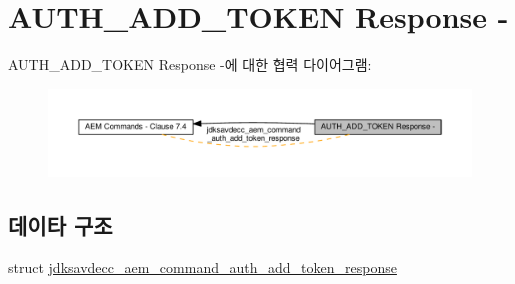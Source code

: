 \hypertarget{group__command__auth__add__token__response}{}\section{A\+U\+T\+H\+\_\+\+A\+D\+D\+\_\+\+T\+O\+K\+EN Response -\/}
\label{group__command__auth__add__token__response}
A\+U\+T\+H\+\_\+\+A\+D\+D\+\_\+\+T\+O\+K\+EN Response -\/에 대한 협력 다이어그램\+:
\nopagebreak
\begin{figure}[H]
\begin{center}
\leavevmode
\includegraphics[width=350pt]{group__command__auth__add__token__response}
\end{center}
\end{figure}
\subsection*{데이타 구조}
\begin{DoxyCompactItemize}
\item 
struct \hyperlink{structjdksavdecc__aem__command__auth__add__token__response}{jdksavdecc\+\_\+aem\+\_\+command\+\_\+auth\+\_\+add\+\_\+token\+\_\+response}
\end{DoxyCompactItemize}

